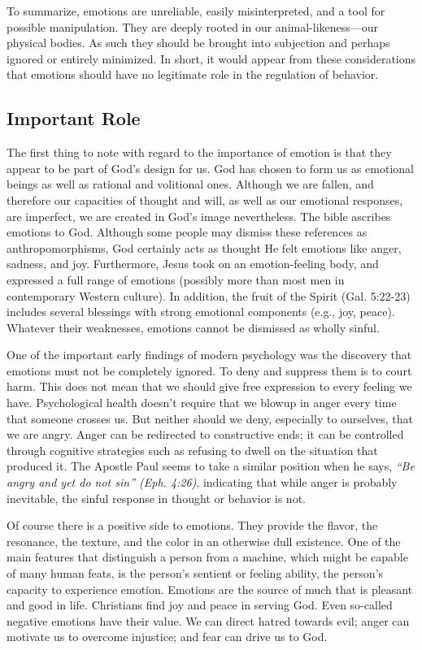 \documentclass[
]{book}
\begin{document}
To summarize, emotions are unreliable, easily misinterpreted, and a tool for possible manipulation. They are deeply rooted in our animal-likeness---our physical bodies. As such they should be brought into subjection and perhaps ignored or entirely minimized. In short, it would appear from these considerations that emotions should have no legitimate role in the regulation of behavior.

\hypertarget{important-role}{%
\subsection*{Important Role}\label{important-role}}

The first thing to note with regard to the importance of emotion is that they appear to be part of God's design for us. God has chosen to form us as emotional beings as well as rational and volitional ones. Although we are fallen, and therefore our capacities of thought and will, as well as our emotional responses, are imperfect, we are created in God's image nevertheless. The bible ascribes emotions to God. Although some people may dismiss these references as anthropomorphisms, God certainly acts as thought He felt emotions like anger, sadness, and joy. Furthermore, Jesus took on an emotion-feeling body, and expressed a full range of emotions (possibly more than most men in contemporary Western culture). In addition, the fruit of the Spirit (Gal. 5:22-23) includes several blessings with strong emotional components (e.g., joy, peace). Whatever their weaknesses, emotions cannot be dismissed as wholly sinful.

One of the important early findings of modern psychology was the discovery that emotions must not be completely ignored. To deny and suppress them is to court harm. This does not mean that we should give free expression to every feeling we have. Psychological health doesn't require that we blowup in anger every time that someone crosses us. But neither should we deny, especially to ourselves, that we are angry. Anger can be redirected to constructive ends; it can be controlled through cognitive strategies such as refusing to dwell on the situation that produced it. The Apostle Paul seems to take a similar position when he says, \emph{``Be angry and yet do not sin'' (Eph. 4:26)}, indicating that while anger is probably inevitable, the sinful response in thought or behavior is not.

Of course there is a positive side to emotions. They provide the flavor, the resonance, the texture, and the color in an otherwise dull existence. One of the main features that distinguish a person from a machine, which might be capable of many human feats, is the person's sentient or feeling ability, the person's capacity to experience emotion. Emotions are the source of much that is pleasant and good in life. Christians find joy and peace in serving God. Even so-called negative emotions have their value. We can direct hatred towards evil; anger can motivate us to overcome injustice; and fear can drive us to God.
\end{document}
